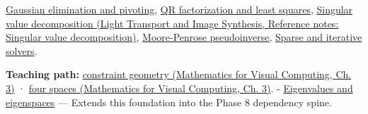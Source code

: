 \hypertarget{appendix-8572a4a060c1-used-by}{}

\hyperref[appendix-f6e77f4a200f]{Gaussian elimination and pivoting}, \hyperref[appendix-c3421e6b4f2c]{QR factorization and least squares}, \href{../04-Light-Transport-and-Image-Synthesis/main.pdf\#nameddest=appendix-1fad5e7f36fa}{Singular value decomposition (Light Transport and Image Synthesis, Reference notes: Singular value decomposition)}, \hyperref[appendix-541306fdbc1b]{Moore-Penrose pseudoinverse}, \hyperref[appendix-67c87a3d9e94]{Sparse and iterative solvers}.

\textbf{Teaching path:} \href{../02-Mathematics-for-Visual-Computing/main.pdf\#nameddest=01-foundations-i-ch019-a-linear-equation-is-a-measurement-and-several-equations-are-geometry}{constraint geometry (Mathematics for Visual Computing, Ch. 3)} · \href{../02-Mathematics-for-Visual-Computing/main.pdf\#nameddest=01-foundations-i-ch019-rank-separates-what-the-measurements-determine-from-what-they-leave-free}{four spaces (Mathematics for Visual Computing, Ch. 3)}. - \hyperref[appendix-0b3be18411f9]{Eigenvalues and eigenspaces} --- Extends this foundation into the Phase 8 dependency spine.
